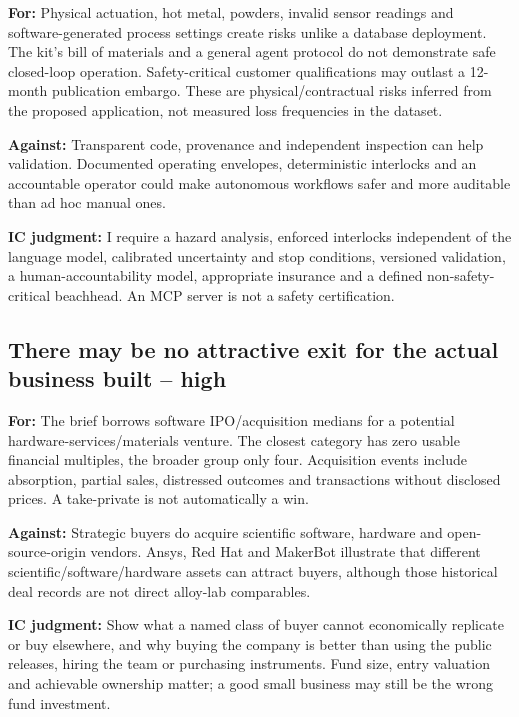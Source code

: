 \textbf{For:} Physical actuation, hot metal, powders, invalid sensor
readings and software-generated process settings create risks unlike a
database deployment. The kit's bill of materials and a general agent
protocol do not demonstrate safe closed-loop operation. Safety-critical
customer qualifications may outlast a 12-month publication embargo.
These are physical/contractual risks inferred from the proposed
application, not measured loss frequencies in the dataset.

\textbf{Against:} Transparent code, provenance and independent
inspection can help validation. Documented operating envelopes,
deterministic interlocks and an accountable operator could make
autonomous workflows safer and more auditable than ad hoc manual ones.

\textbf{IC judgment:} I require a hazard analysis, enforced interlocks
independent of the language model, calibrated uncertainty and stop
conditions, versioned validation, a human-accountability model,
appropriate insurance and a defined non-safety-critical beachhead. An
MCP server is not a safety certification.

\subsection{There may be no attractive exit for the actual business
built --
high}\label{there-may-be-no-attractive-exit-for-the-actual-business-built-high}

\textbf{For:} The brief borrows software IPO/acquisition medians for a
potential hardware-services/materials venture. The closest category has
zero usable financial multiples, the broader group only four.
Acquisition events include absorption, partial sales, distressed
outcomes and transactions without disclosed prices. A take-private is
not automatically a win. \citep{InputData,Boysel2025State}

\textbf{Against:} Strategic buyers do acquire scientific software,
hardware and open-source-origin vendors. Ansys, Red Hat and MakerBot
illustrate that different scientific/software/hardware assets can
attract buyers, although those historical deal records are not direct
alloy-lab comparables.

\textbf{IC judgment:} Show what a named class of buyer cannot
economically replicate or buy elsewhere, and why buying the company is
better than using the public releases, hiring the team or purchasing
instruments. Fund size, entry valuation and achievable ownership matter;
a good small business may still be the wrong fund investment.

